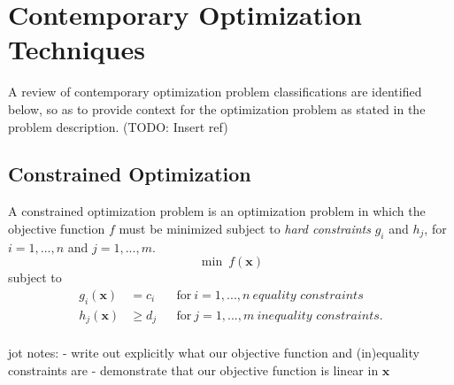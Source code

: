 \documentclass[../mthe-493-final-project.tex]{subfiles}
\begin{document}
    \chapter{Contemporary Optimization Techniques}
    \label{ch:contemporary-optimization}

    A review of contemporary optimization problem classifications are identified below, so as to provide context for the optimization problem as stated in the problem description. (TODO: Insert ref)




    \section{Constrained Optimization}
    \label{sec:Constrained Optimization}

    A constrained optimization problem is an optimization problem in which the objective function $f$ must be minimized subject to \textit{hard constraints} $g_i$ and $h_j$, for $i=1,...,n$ and $j=1,...,m$.
    \[ \min \ f(\mathbf{x}) \]
    subject to
    \begin{align*}
        g_i(\mathbf{x}) &= c_i    & &\text{for} \ i = 1,...,n \ \textit{equality constraints}    \\
        h_j(\mathbf{x}) &\geq d_j & &\text{for} \ j = 1,...,m \ \textit{inequality constraints}. \\
    \end{align*}

    jot notes:
    - write out explicitly what our objective function and (in)equality constraints are
    - demonstrate that our objective function is linear in $\mathbf{x}$
\end{document}
